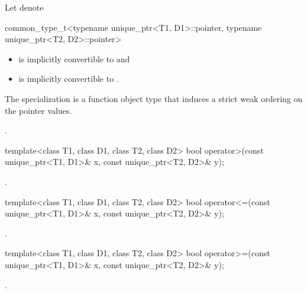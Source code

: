 \begin{itemdescr}
\pnum
Let  denote
\begin{codeblock}
common_type_t<typename unique_ptr<T1, D1>::pointer,
              typename unique_ptr<T2, D2>::pointer>
\end{codeblock}

\pnum
\mandates
\begin{itemize}
\item {} is implicitly convertible to  and
\item {} is implicitly convertible to .
\end{itemize}

\pnum
\expects
The specialization
 is a function object type that
induces a strict weak ordering on the pointer values.

\pnum
\returns
{}.
\end{itemdescr}

%
\begin{itemdecl}
template<class T1, class D1, class T2, class D2>
  bool operator>(const unique_ptr<T1, D1>& x, const unique_ptr<T2, D2>& y);
\end{itemdecl}

\begin{itemdescr}
\pnum
\returns
{}.
\end{itemdescr}

%
\begin{itemdecl}
template<class T1, class D1, class T2, class D2>
  bool operator<=(const unique_ptr<T1, D1>& x, const unique_ptr<T2, D2>& y);
\end{itemdecl}

\begin{itemdescr}
\pnum
\returns
{}.
\end{itemdescr}

%
\begin{itemdecl}
template<class T1, class D1, class T2, class D2>
  bool operator>=(const unique_ptr<T1, D1>& x, const unique_ptr<T2, D2>& y);
\end{itemdecl}

\begin{itemdescr}
\pnum
\returns
{}.
\end{itemdescr}

